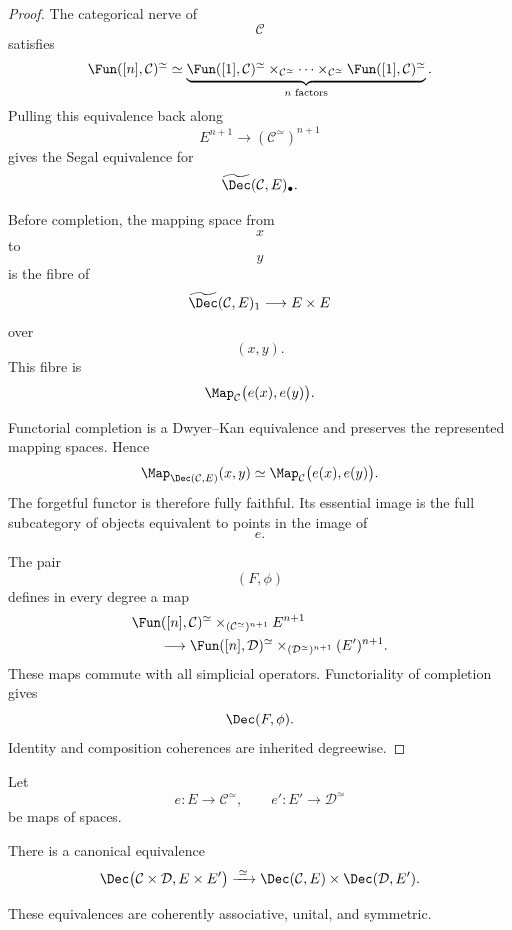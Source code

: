 \begin{proof}
The categorical nerve of
\[
    \mathcal C
\]
satisfies
\[
\begin{aligned}
    \Fun([n],\mathcal C)^\simeq
    \simeq
    \underbrace{
        \Fun([1],\mathcal C)^\simeq
        \times_{\mathcal C^\simeq}
        \cdots
        \times_{\mathcal C^\simeq}
        \Fun([1],\mathcal C)^\simeq
    }_{n\text{ factors}}.
\end{aligned}
\]
Pulling this equivalence back along
\[
    E^{n+1}
    \longrightarrow
    (\mathcal C^\simeq)^{n+1}
\]
gives the Segal equivalence for
\[
    \widetilde{\Dec}(\mathcal C,E)_\bullet.
\]

Before completion, the mapping space from
\[
    x
\]
to
\[
    y
\]
is the fibre of
\[
    \widetilde{\Dec}(\mathcal C,E)_1
    \longrightarrow
    E\times E
\]
over
\[
    (x,y).
\]
This fibre is
\[
    \Map_{\mathcal C}
    \bigl(
        e(x),
        e(y)
    \bigr).
\]

Functorial completion is a Dwyer--Kan equivalence and preserves the
represented mapping spaces. Hence
\[
    \Map_{\Dec(\mathcal C,E)}(x,y)
    \simeq
    \Map_{\mathcal C}
    \bigl(
        e(x),
        e(y)
    \bigr).
\]
The forgetful functor is therefore fully faithful. Its essential image
is the full subcategory of objects equivalent to points in the image of
\[
    e.
\]

The pair
\[
    (F,\phi)
\]
defines in every degree a map
\[
\begin{aligned}
    &
    \Fun([n],\mathcal C)^\simeq
    \times_{(\mathcal C^\simeq)^{n+1}}
    E^{n+1}
    \\
    &\qquad\longrightarrow
    \Fun([n],\mathcal D)^\simeq
    \times_{(\mathcal D^\simeq)^{n+1}}
    (E')^{n+1}.
\end{aligned}
\]
These maps commute with all simplicial operators. Functoriality of
completion gives
\[
    \Dec(F,\phi).
\]
Identity and composition coherences are inherited degreewise.
\end{proof}

\begin{proposition}
\label{prop:object-decoration-products}
Let
\[
    e
    \colon
    E
    \longrightarrow
    \mathcal C^\simeq,
    \qquad
    e'
    \colon
    E'
    \longrightarrow
    \mathcal D^\simeq
\]
be maps of spaces.

There is a canonical equivalence
\[
    \Dec
    \bigl(
        \mathcal C\times\mathcal D,
        E\times E'
    \bigr)
    \xrightarrow{\;\simeq\;}
    \Dec(\mathcal C,E)
    \times
    \Dec(\mathcal D,E').
\]

These equivalences are coherently associative, unital, and symmetric.
\end{proposition}

